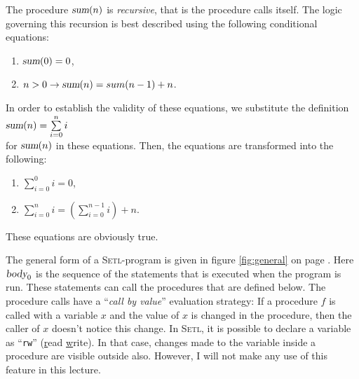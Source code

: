 The procedure $\textsl{sum}(n)$ is \emph{recursive}, that is the procedure calls itself.
The logic governing this recursion is best described using the following conditional equations:
\begin{enumerate}
\item $\textsl{sum}(0) = 0$,
\item $n > 0 \rightarrow \textsl{sum}(n) = sum(n-1) + n$.
\end{enumerate}
In order to establish the validity of these equations, we substitute 
the definition 
\\[0.2cm]
\hspace*{1.3cm}
$\textsl{sum}(n)= \sum\limits_{i=0}^n i$ 
\\[0.2cm]
for $\textsl{sum}(n)$ in these equations.  Then, the equations are transformed into the following:
\begin{enumerate}
\item $\sum\limits_{i=0}^0 i = 0$,
\item $\sum\limits_{i=0}^n i = \left(\sum\limits_{i=0}^{n-1} i\right) + n$. 
\end{enumerate}
These equations are obviously true.

The general form of a  \textsc{Setl}-program is given in figure
\ref{fig:general} on page \pageref{fig:general}.
Here $\textsl{body}_0$ is the sequence of the statements that is executed when the program
is run.  These statements can call the procedures that are defined below.  The procedure
calls have a ``\emph{call by value}'' evaluation strategy: If a procedure $f$ is called
with a variable $x$ and the value of $x$ is changed in the procedure, then the caller of
$x$ doesn't notice this change.  In \textsc{Setl}, it is possible to declare a variable as
``\texttt{rw}'' (\underline{r}ead \underline{w}rite).  In that case, changes made to the
variable inside a procedure are visible outside also.  However, I will not
make any use of this feature in this lecture.

